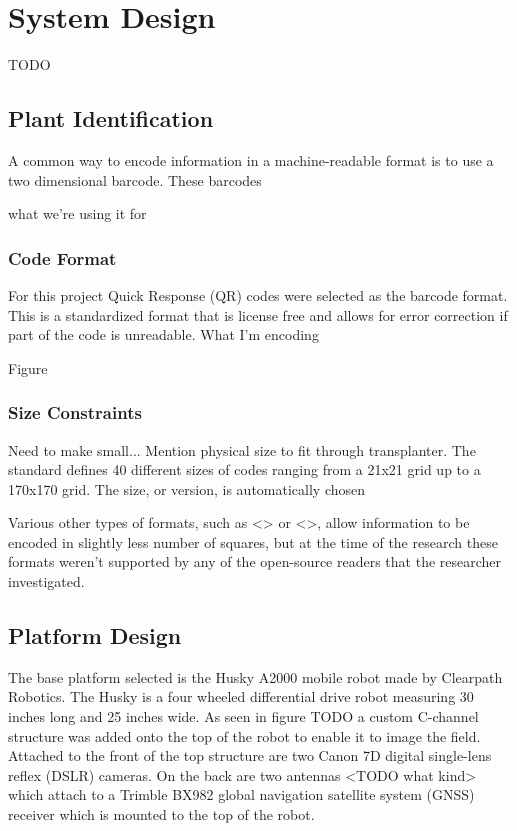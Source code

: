 
\cleardoublepage

\chapter{System Design}
\label{system}

TODO

\section{Plant Identification}
\label{system-plantid}

A common way to encode information in a machine-readable format is to use a two dimensional barcode.  These barcodes 

what we're using it for


\subsection{Code Format}

For this project Quick Response (QR) codes were selected as the barcode format. This is a standardized format that is license free and allows for error correction if part of the code is unreadable.  What I'm encoding

Figure 

\subsection{Size Constraints}

Need to make small...  Mention physical size to fit through transplanter.
The standard defines 40 different sizes of codes ranging from a 21x21 grid up to a 170x170 grid.  The size, or version, is automatically chosen 

Various other types of formats, such as <> or <>, allow information to be encoded in slightly less number of squares, but at the time of the research these formats weren't supported by any of the open-source readers that the researcher investigated.  

\section{Platform Design}
\label{system-platform}

The base platform selected is the Husky A2000 mobile robot made by Clearpath Robotics.  The Husky is a four wheeled differential drive robot measuring 30 inches long and 25 inches wide.  As seen in figure TODO a custom C-channel structure was added onto the top of the robot to enable it to image the field.  Attached to the front of the top structure are two Canon 7D digital single-lens reflex (DSLR) cameras. On the back are two antennas <TODO what kind> which attach to a Trimble BX982 global navigation satellite system (GNSS) receiver which is mounted to the top of the robot.   


